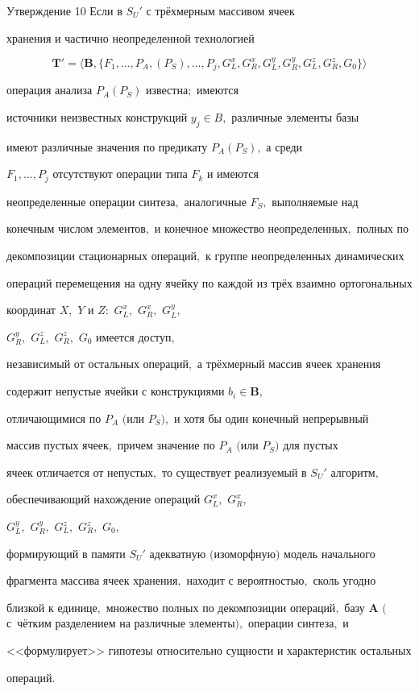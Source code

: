 \hypertarget{kr:utv10}{}



\begin{newthm}{Утверждение 10} Если в $S_{U}'$ с трёхмерным массивом ячеек

хранения и частично неопределенной технологией

$$

\mathbf{T}' =\langle \mathbf{B},

\{F_{1},\ldots, P_{A}, (P_{S}),\ldots, P_{j}, G^{x}_{L},

G^{x}_{R}, G^{y}_{L}, G^{y}_{R}, G^{z}_{L}, G^{z}_{R},

G_{0}\}\rangle

$$

операция анализа $P_{A}(P_{S})$ известна$;$ имеются

источники неизвестных конструкций $y_{j} \in  B,$ различные элементы базы

имеют различные значения по предикату $P_{A} (P_{S}),$ а среди

$F_{1},\ldots, P_{j}$ отсутствуют операции типа $F_{k}$ и имеются

неопределенные операции синтеза$,$ аналогичные $F_{S},$ выполняемые над

конечным числом элементов$,$ и конечное множество неопределенных$,$ полных по

декомпозиции стационарных операций$,$ к группе неопределенных динамических

операций перемещения на одну ячейку по каждой из трёх взаимно ортогональных

координат $X,$ $Y$ и $Z{:}$ $G^{x}_{L},$ $G^{x}_{R},$ $G^{y}_{L},$

$G^{y}_{R},$ $G^{z}_{L},$ $G^{z}_{R},$ $G_{0}$ имеется доступ$,$

независимый от остальных операций$,$ а трёхмерный массив ячеек хранения

содержит непустые ячейки с конструкциями $b_{i} \in \mathbf{B},$

отличающимися по $P_{A}$ $($или $P_{S}),$ и хотя бы один конечный непрерывный

массив пустых ячеек$,$ причем значение по $P_{A}$ $($или $P_{S})$ для пустых

ячеек отличается от непустых$,$ то существует реализуемый в $S_{U}'$ алгоритм$,$

обеспечивающий нахождение операций $G^{x}_{L},$ $G^{x}_{R},$

$G^{y}_{L},$ $G^{y}_{R},$ $G^{z}_{L},$ $G^{z}_{R},$ $G_{0},$

формирующий в памяти $S_{U}'$ адекватную $($изоморфную$)$ модель начального

фрагмента массива ячеек хранения$,$ находит с вероятностью$,$ сколь угодно

близкой к единице$,$ множество полных по декомпозиции операций$,$ базу $\mathbf{A}$ $($с~чётким разделением на различные элементы$),$ операции синтеза$,$ и

<<формулирует>> гипотезы относительно сущности и характеристик остальных

операций\rm.

\end{newthm}




